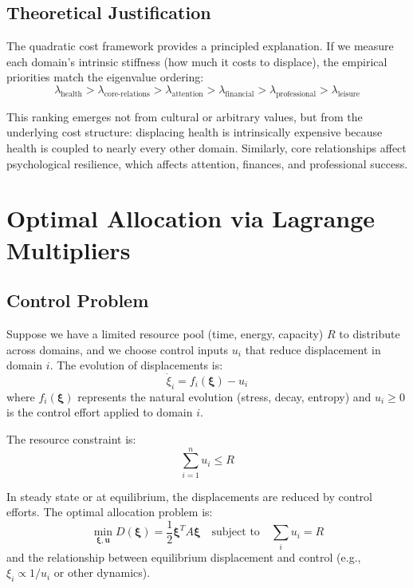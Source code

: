 \documentclass[12pt]{article}
\begin{document}
\subsection{Theoretical Justification}

The quadratic cost framework provides a principled explanation. If we measure each domain's intrinsic stiffness (how much it costs to displace), the empirical priorities match the eigenvalue ordering:
\begin{equation}
\lambda_{\text{health}} > \lambda_{\text{core-relations}} > \lambda_{\text{attention}} > \lambda_{\text{financial}} > \lambda_{\text{professional}} > \lambda_{\text{leisure}}
\end{equation}

This ranking emerges not from cultural or arbitrary values, but from the underlying cost structure: displacing health is intrinsically expensive because health is coupled to nearly every other domain. Similarly, core relationships affect psychological resilience, which affects attention, finances, and professional success.

\section{Optimal Allocation via Lagrange Multipliers}

\subsection{Control Problem}

Suppose we have a limited resource pool (time, energy, capacity) $R$ to distribute across domains, and we choose control inputs $u_i$ that reduce displacement in domain $i$. The evolution of displacements is:
\begin{equation}
\dot{\xi}_i = f_i(\boldsymbol{\xi}) - u_i
\end{equation}
where $f_i(\boldsymbol{\xi})$ represents the natural evolution (stress, decay, entropy) and $u_i \geq 0$ is the control effort applied to domain $i$.

The resource constraint is:
\begin{equation}
\sum_{i=1}^n u_i \leq R
\end{equation}

In steady state or at equilibrium, the displacements are reduced by control efforts. The optimal allocation problem is:
\begin{equation}
\min_{\boldsymbol{\xi}, \boldsymbol{u}} D(\boldsymbol{\xi}) = \frac{1}{2} \boldsymbol{\xi}^T A \boldsymbol{\xi} \quad \text{subject to} \quad \sum_i u_i = R
\end{equation}
and the relationship between equilibrium displacement and control (e.g., $\xi_i \propto 1/u_i$ or other dynamics).
\end{document}
